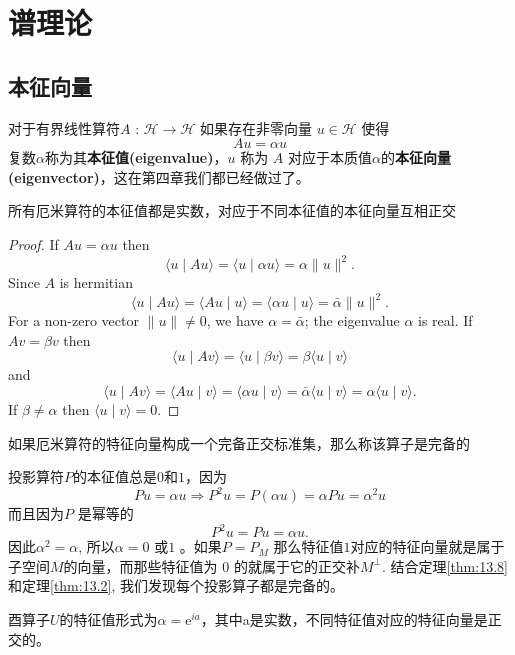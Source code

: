 \section{谱理论}
\subsection{本征向量}
对于有界线性算符\(A\) : \(\mathcal{H} \rightarrow \mathcal{H}\) 如果存在非零向量 \(u \in \mathcal{H}\) 使得
\[
A u=\alpha u 
\]
复数\(\alpha\)称为其\textbf{本征值(eigenvalue)}，\(u\) 称为 \(A\) 对应于本质值\(\alpha\)的\textbf{本征向量(eigenvector)}，这在第四章我们都已经做过了。
\begin{theorem}\label{thm:13.15}
    所有厄米算符的本征值都是实数，对应于不同本征值的本征向量互相正交
\end{theorem}
\begin{proof}
If \(A u=\alpha u\) then
\[
\langle u \mid A u\rangle=\langle u \mid \alpha u\rangle=\alpha\|u\|^{2} .
\]
Since \(A\) is hermitian
\[
\langle u \mid A u\rangle=\langle A u \mid u\rangle=\langle\alpha u \mid u\rangle=\bar{\alpha}\|u\|^{2} .
\]
For a non-zero vector \(\|u\| \neq 0\), we have \(\alpha=\bar{\alpha}\); the eigenvalue \(\alpha\) is real.
If \(A v=\beta v\) then
\[
\langle u \mid A v\rangle=\langle u \mid \beta v\rangle=\beta\langle u \mid v\rangle
\]
and
\[
\langle u \mid A v\rangle=\langle A u \mid v\rangle=\langle\alpha u \mid v\rangle=\bar{\alpha}\langle u \mid v\rangle=\alpha\langle u \mid v\rangle .
\]
If \(\beta \neq \alpha\) then \(\langle u \mid v\rangle=0\).
\end{proof}
如果厄米算符的特征向量构成一个完备正交标准集，那么称该算子是完备的
\begin{eg} 
投影算符\(P\)的本征值总是\(0\)和\(1\)，因为
\[
P u=\alpha u \Longrightarrow P^{2} u=P(\alpha u)=\alpha P u=\alpha^{2} u
\]
而且因为\(P\) 是幂等的
\[
P^{2} u=P u=\alpha u .
\]
因此\(\alpha^{2}=\alpha\), 所以\(\alpha=0\) 或\(1\) 。如果\(P=P_{M}\) 那么特征值\(1\)对应的特征向量就是属于子空间\(M\)的向量，而那些特征值为 0 的就属于它的正交补\(M^{\perp}\). 结合定理\ref{thm:13.8} 和定理\ref{thm:13.2}, 我们发现每个投影算子都是完备的。
\end{eg} 
\begin{theorem}
    酉算子\(U\)的特征值形式为\(\alpha=\mathrm{e}^{i a}\)，其中a是实数，不同特征值对应的特征向量是正交的。
\end{theorem}
